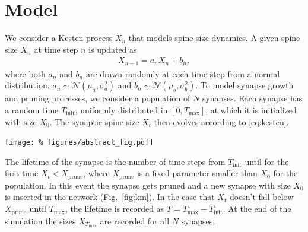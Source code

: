 
\vspace{-0.4cm}
\section*{Model}
\vspace{-0.4cm}

We consider a Kesten process $X_n$ that models spine size dynamics. A given spine size $X_n$ at time step $n$ is updated as
%
\begin{align}
  X_{n+1} = a_n X_n + b_n, \label{eq:kesten}
\end{align}
%
where both $a_n$ and $b_n$ are drawn randomly at each time step from a normal distribution, $a_n \sim \mathcal{N}(\mu_a, \sigma_a^2)$ and $b_n \sim \mathcal{N}(\mu_b, \sigma_b^2)$. To model synapse growth and pruning processes, we consider a population of $N$ synapses. Each synapse has a random time $T_{\mathrm{init}}$, uniformly distributed in $[0,T_{\text{max}}]$, at which it is initialized with size $X_0$. The synaptic spine size $X_t$ then evolves according to \eqref{eq:kesten}.

\begin{minipage}{\columnwidth}
  \begin{center}
    \vspace{0.5cm}
  \texttt{[image: \%
    figures/abstract\_fig.pdf]}
  \label{fig:km}
\end{center}
\end{minipage}


The lifetime of the synapse is the number of time steps from $T_{\text{init}}$ until for the first time $X_t < X_{\mathrm{prune}}$, where $X_{\mathrm{prune}}$ is a fixed parameter smaller than $X_0$ for the population. In this event the synapse gets pruned and a new synapse with size $X_0$ is inserted in the network (Fig.~\ref{fig:km}). In the case that $X_t$ doesn't fall below $X_{\mathrm{prune}}$ until $T_{\text{max}}$, the lifetime is recorded as $T=T_{\text{max}}-T_{\text{init}}$. At the end of the simulation the sizes $X_{T_{\text{max}}}$ are recorded for all $N$ synapses.

